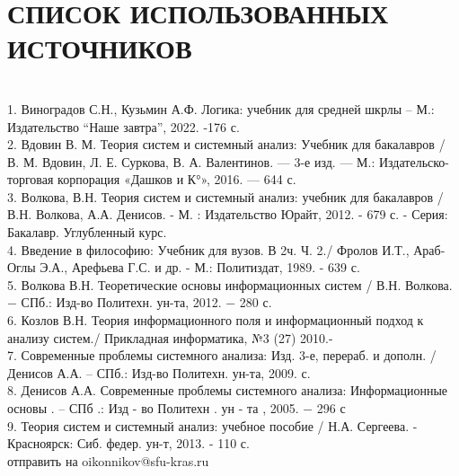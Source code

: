 \documentclass[a4paper,12pt]{report}
\begin{document}
	\chapter*{СПИСОК ИСПОЛЬЗОВАННЫХ ИСТОЧНИКОВ} 
\\
1. Виноградов С.Н., Кузьмин А.Ф. Логика: учебник для средней шкрлы – М.: Издательство “Наше завтра”, 2022. -176 с.\\
2. Вдовин В. М. Теория систем и системный анализ: Учебник для бакалавров / В. М. Вдовин, Л. Е. Суркова, В. А. Валентинов. — 3-е изд. — М.: Издательско-торговая корпорация «Дашков и К°», 2016. — 644 с.\\
3. Волкова, В.Н. Теория систем и системный анализ: учебник для бакалавров /В.Н. Волкова, А.А. Денисов. - М. : Издательство Юрайт, 2012. - 679 с. - Серия: Бакалавр. Углубленный курс.\\
4. Введение в философию: Учебник для вузов. В 2ч. Ч. 2./ Фролов И.Т., Араб-Оглы Э.А., Арефьева Г.С. и др. - М.: Политиздат, 1989. - 639 с.\\
5. Волкова В.Н. Теоретические основы информационных систем / В.Н. Волкова. − СПб.: Изд-во Политехн. ун-та, 2012. − 280 с.\\
6. Козлов В.Н. Теория информационного поля и информационный подход к анализу систем./ Прикладная информатика, №3 (27) 2010.-\\
7. Современные проблемы системного анализа: Изд. 3-е, перераб.  и дополн. / Денисов А.А. – СПб.: Изд-во Политехн. ун-та, 2009. с.\\
8. Денисов А.А. Современные проблемы системного анализа: Информационные основы . – СПб .: Изд - во Политехн . ун - та , 2005. − 296 с \\
9. Теория систем и системный анализ: учебное пособие / Н.А. Сергеева. - Красноярск: Сиб. федер. ун-т, 2013. - 110 с.\\
    
    
    отправить на oikonnikov@sfu-kras.ru
   	
\end{document}
